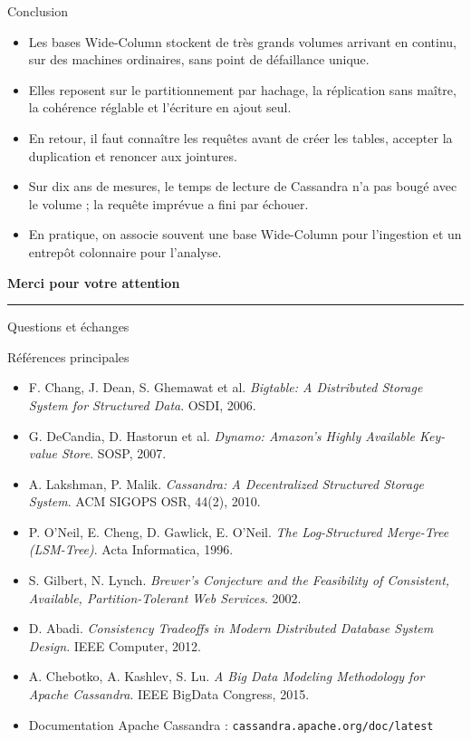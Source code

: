 \documentclass[aspectratio=169,10pt]{beamer}
\begin{document}
\begin{frame}{Conclusion}
  \begin{itemize}
    \item Les bases Wide-Column stockent de très grands volumes arrivant en continu, sur des machines ordinaires, sans point de défaillance unique.
    \item Elles reposent sur le partitionnement par hachage, la réplication sans maître, la cohérence réglable et l'écriture en ajout seul.
    \item En retour, il faut connaître les requêtes avant de créer les tables, accepter la duplication et renoncer aux jointures.
    \item Sur dix ans de mesures, le temps de lecture de Cassandra n'a pas bougé avec le volume ; la requête imprévue a fini par échouer.
    \item En pratique, on associe souvent une base Wide-Column pour l'ingestion et un entrepôt colonnaire pour l'analyse.
  \end{itemize}
\end{frame}

\begin{frame}
  \centering
  \vfill
  {\Large\bfseries Merci pour votre attention\par}
  \vspace{0.3cm}
  {\color{accent!35}\rule{0.4\linewidth}{0.5pt}\par}
  \vspace{0.3cm}
  {\color{gris}Questions et échanges\par}
  \vfill
\end{frame}

\begin{frame}{Références principales}
  \footnotesize
  \begin{itemize}
    \item F. Chang, J. Dean, S. Ghemawat et al. \emph{Bigtable: A Distributed Storage System for Structured Data}. OSDI, 2006.
    \item G. DeCandia, D. Hastorun et al. \emph{Dynamo: Amazon's Highly Available Key-value Store}. SOSP, 2007.
    \item A. Lakshman, P. Malik. \emph{Cassandra: A Decentralized Structured Storage System}. ACM SIGOPS OSR, 44(2), 2010.
    \item P. O'Neil, E. Cheng, D. Gawlick, E. O'Neil. \emph{The Log-Structured Merge-Tree (LSM-Tree)}. Acta Informatica, 1996.
    \item S. Gilbert, N. Lynch. \emph{Brewer's Conjecture and the Feasibility of Consistent, Available, Partition-Tolerant Web Services}. 2002.
    \item D. Abadi. \emph{Consistency Tradeoffs in Modern Distributed Database System Design}. IEEE Computer, 2012.
    \item A. Chebotko, A. Kashlev, S. Lu. \emph{A Big Data Modeling Methodology for Apache Cassandra}. IEEE BigData Congress, 2015.
    \item Documentation Apache Cassandra : \texttt{cassandra.apache.org/doc/latest}
  \end{itemize}
\end{frame}
\end{document}
